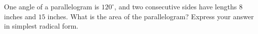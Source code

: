 One angle of a parallelogram is $120^\circ$, and two consecutive sides have lengths $8$ inches and $15$ inches. What is the area of the parallelogram? Express your answer in simplest radical form.
